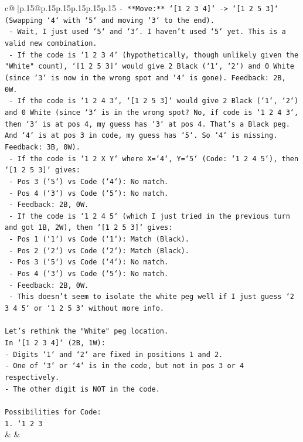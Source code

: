 \documentclass{article}
\begin{document}
{\begin{supertabular}{c@{$\;$}|p{.15\linewidth}@{}p{.15\linewidth}p{.15\linewidth}p{.15\linewidth}p{.15\linewidth}p{.15\linewidth}}
{{{\texttt{{-} **Move:** `{[}1 2 3 4{]}` {-}> `{[}1 2 5 3{]}` (Swapping `4` with `5` and moving `3` to the end).} \\
\texttt{  {-} Wait, I just used `5` and `3`. I haven't used `5` yet. This is a valid new combination.} \\
\texttt{  {-} If the code is `1 2 3 4` (hypothetically, though unlikely given the "White" count), `{[}1 2 5 3{]}` would give 2 Black (`1`, `2`) and 0 White (since `3` is now in the wrong spot and `4` is gone). Feedback: 2B, 0W.} \\
\texttt{  {-} If the code is `1 2 4 3`, `{[}1 2 5 3{]}` would give 2 Black (`1`, `2`) and 0 White (since `3` is in the wrong spot? No, if code is `1 2 4 3`, then `3` is at pos 4, my guess has `3` at pos 4. That's a Black peg. And `4` is at pos 3 in code, my guess has `5`. So `4` is missing. Feedback: 3B, 0W).} \\
\texttt{  {-} If the code is `1 2 X Y` where X=`4`, Y=`5` (Code: `1 2 4 5`), then `{[}1 2 5 3{]}` gives:} \\
\texttt{    {-} Pos 3 (`5`) vs Code (`4`): No match.} \\
\texttt{    {-} Pos 4 (`3`) vs Code (`5`): No match.} \\
\texttt{    {-} Feedback: 2B, 0W.} \\
\texttt{  {-} If the code is `1 2 4 5` (which I just tried in the previous turn and got 1B, 2W), then `{[}1 2 5 3{]}` gives:} \\
\texttt{    {-} Pos 1 (`1`) vs Code (`1`): Match (Black).} \\
\texttt{    {-} Pos 2 (`2`) vs Code (`2`): Match (Black).} \\
\texttt{    {-} Pos 3 (`5`) vs Code (`4`): No match.} \\
\texttt{    {-} Pos 4 (`3`) vs Code (`5`): No match.} \\
\texttt{    {-} Feedback: 2B, 0W.} \\
\texttt{  {-} This doesn't seem to isolate the white peg well if I just guess `2 3 4 5` or `1 2 5 3` without more info.} \\
\\ 
\texttt{Let's rethink the "White" peg location.} \\
\texttt{In `{[}1 2 3 4{]}` (2B, 1W):} \\
\texttt{{-} Digits `1` and `2` are fixed in positions 1 and 2.} \\
\texttt{{-} One of `3` or `4` is in the code, but not in pos 3 or 4 respectively.} \\
\texttt{{-} The other digit is NOT in the code.} \\
\\ 
\texttt{Possibilities for Code:} \\
\texttt{1. `1 2 3} \\
            }
        }
    }
    & & \\ \\


\end{supertabular}}
\end{document}
